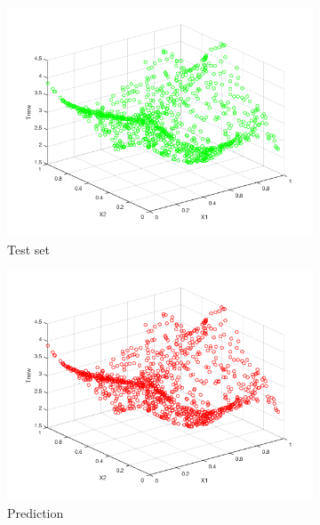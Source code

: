 \documentclass[a4paper, 10pt]{article}
\begin{document}
  \begin{figure}[htb]
    \begin{adjustwidth}{-1.1cm}{-1.1cm}
    \centering
    \begin{subfigure}[t]{0.3\linewidth}
      \includegraphics[width=1\linewidth]{./project/scatter_ytest_green.png}
      \caption{Test set}
    \end{subfigure}
    \begin{subfigure}[t]{0.3\linewidth}
      \includegraphics[width=1\linewidth]{./project/scatter_ysim.png}
      \caption{Prediction}
      \label{fig:overfit}
    \end{subfigure}
    \begin{subfigure}[t]{0.3\linewidth}

\end{subfigure}
\end{adjustwidth}
\end{figure}
\end{document}
